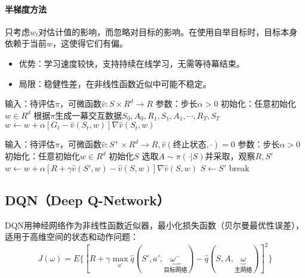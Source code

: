 \documentclass[
12pt, %
a4paper, 
oneside, %
headinclude,footinclude, %
]{scrartcl}
\begin{document}
\paragraph{半梯度方法}
只考虑$ w_t $对估计值的影响，而忽略对目标的影响。在使用自举目标时，目标本身依赖于当前$ w $，这使得它们有偏。
\begin{itemize}
\item 优势：学习速度较快，支持持续在线学习，无需等待幕结束。
\item 局限：稳健性差，在非线性函数近似中可能不稳定。
\end{itemize}
\begin{myalgorithm}[梯度蒙特卡洛]
\State 输入：待评估$ \pi $，可微函数$ \hat{v}:S \times R^d \to R $
\State 参数：步长$ \alpha > 0 $
\State 初始化：任意初始化$ w \in R^d $
\Loop {}
\State 根据$ \pi $生成一幕交互数据$ S_0, A_0, R_1, S_1, A_1, \cdots, R_T, S_T $
\State $ w \gets w + \alpha[G_t - \hat{v}(S_t, w)]\nabla\hat{v}(S_t, w)$
\EndFor
\EndLoop
\end{myalgorithm}
\begin{myalgorithm}[半梯度TD(0)]
\State 输入：待评估$ \pi $，可微函数$ \hat{v}:S^+ \times R^d \to R, \hat{v}(\text{终止状态}, \cdot) = 0 $
\State 参数：步长$ \alpha > 0 $
\State 初始化：任意初始化$ w \in R^d $
\Loop {}
\State 初始化$ S $
\State 选取$ A \sim \pi(\cdot|S) $并采取，观察$ R,S' $
\State $ w \gets w + \alpha[R + \gamma\hat{v}(S', w) - \hat{v}(S, w)]\nabla\hat{v}(S, w) $
\State $ S \gets S' $
\State break
\EndIf
\EndFor
\EndLoop
\end{myalgorithm}
\subsection[DQN]{DQN（Deep Q-Network）}
DQN用神经网络作为非线性函数近似器，最小化损失函数（贝尔曼最优性误差），适用于高维空间的状态和动作问题：
$$ J(\omega) = E\{[R + \gamma \max_{a'} \hat{q}(S', a', \underbrace{\omega^-}_{\text{目标网络}}) - \hat{q}(S, A, \underbrace{\omega}_{\text{主网络}})]^2\} $$
\end{document}

